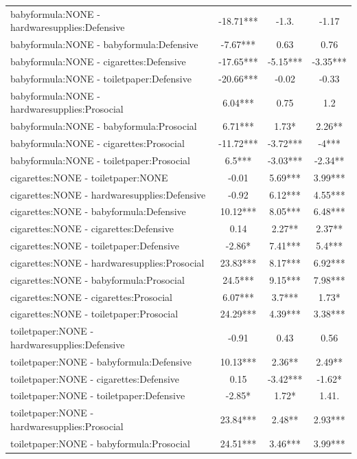 \documentclass[]{report}
\begin{document}
\begin{longtable}{lccc}
			babyformula:NONE - hardwaresupplies:Defensive & -18.71*** & -1.3. & -1.17 \\ 
			babyformula:NONE - babyformula:Defensive & -7.67*** & 0.63 & 0.76 \\ 
			babyformula:NONE - cigarettes:Defensive & -17.65*** & -5.15*** & -3.35*** \\ 
			babyformula:NONE - toiletpaper:Defensive & -20.66*** & -0.02 & -0.33 \\ 
			babyformula:NONE - hardwaresupplies:Prosocial & 6.04*** & 0.75 & 1.2 \\ 
			babyformula:NONE - babyformula:Prosocial & 6.71*** & 1.73* & 2.26** \\ 
			babyformula:NONE - cigarettes:Prosocial & -11.72*** & -3.72*** & -4*** \\ 
			babyformula:NONE - toiletpaper:Prosocial & 6.5*** & -3.03*** & -2.34** \\ 
			cigarettes:NONE - toiletpaper:NONE & -0.01 & 5.69*** & 3.99*** \\ 
			cigarettes:NONE - hardwaresupplies:Defensive & -0.92 & 6.12*** & 4.55*** \\ 
			cigarettes:NONE - babyformula:Defensive & 10.12*** & 8.05*** & 6.48*** \\ 
			cigarettes:NONE - cigarettes:Defensive & 0.14 & 2.27** & 2.37** \\ 
			cigarettes:NONE - toiletpaper:Defensive & -2.86* & 7.41*** & 5.4*** \\ 
			cigarettes:NONE - hardwaresupplies:Prosocial & 23.83*** & 8.17*** & 6.92*** \\ 
			cigarettes:NONE - babyformula:Prosocial & 24.5*** & 9.15*** & 7.98*** \\ 
			cigarettes:NONE - cigarettes:Prosocial & 6.07*** & 3.7*** & 1.73* \\ 
			cigarettes:NONE - toiletpaper:Prosocial & 24.29*** & 4.39*** & 3.38*** \\ 
			toiletpaper:NONE - hardwaresupplies:Defensive & -0.91 & 0.43 & 0.56 \\ 
			toiletpaper:NONE - babyformula:Defensive & 10.13*** & 2.36** & 2.49** \\ 
			toiletpaper:NONE - cigarettes:Defensive & 0.15 & -3.42*** & -1.62* \\ 
			toiletpaper:NONE - toiletpaper:Defensive & -2.85* & 1.72* & 1.41. \\ 
			toiletpaper:NONE - hardwaresupplies:Prosocial & 23.84*** & 2.48** & 2.93*** \\ 
			toiletpaper:NONE - babyformula:Prosocial & 24.51*** & 3.46*** & 3.99*** \\ 

\end{longtable}
\end{document}
